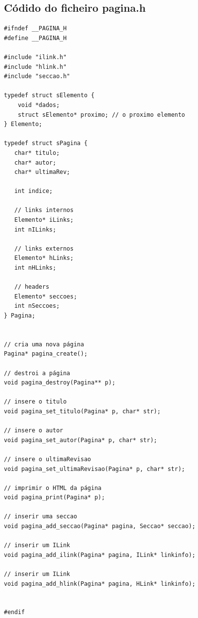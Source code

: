 \documentclass[11pt, a4paper, oneside]{article}
\begin{document}
\subsection{Códido do ficheiro pagina.h}
\begin{verbatim}
#ifndef __PAGINA_H
#define __PAGINA_H

#include "ilink.h"
#include "hlink.h"
#include "seccao.h"

typedef struct sElemento {
    void *dados;
    struct sElemento* proximo; // o proximo elemento
} Elemento;

typedef struct sPagina {
   char* titulo;
   char* autor;
   char* ultimaRev;

   int indice;

   // links internos
   Elemento* iLinks;
   int nILinks;

   // links externos
   Elemento* hLinks;
   int nHLinks;
   
   // headers
   Elemento* seccoes;
   int nSeccoes;
} Pagina;


// cria uma nova página
Pagina* pagina_create();

// destroi a página
void pagina_destroy(Pagina** p);

// insere o titulo
void pagina_set_titulo(Pagina* p, char* str);

// insere o autor
void pagina_set_autor(Pagina* p, char* str);

// insere o ultimaRevisao
void pagina_set_ultimaRevisao(Pagina* p, char* str);

// imprimir o HTML da página
void pagina_print(Pagina* p);

// inserir uma seccao
void pagina_add_seccao(Pagina* pagina, Seccao* seccao);

// inserir um ILink
void pagina_add_ilink(Pagina* pagina, ILink* linkinfo);

// inserir um ILink
void pagina_add_hlink(Pagina* pagina, HLink* linkinfo);


#endif
\end{verbatim}


\newpage
\end{document}
